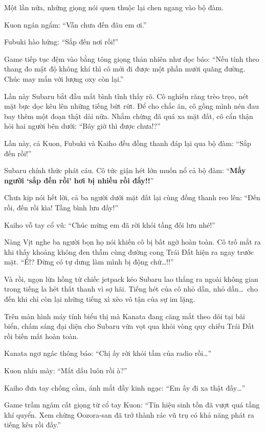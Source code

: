 \documentclass[../main.tex]{subfiles}
\begin{document}
Một lần nữa, những giọng nói quen thuộc lại chen ngang vào bộ đàm.

Kuon ngán ngẩm: ``Vẫn chưa đến đâu em ơi.''

Fubuki hào hứng: ``Sắp đến nơi rồi!''

Game tiếp tục đệm vào bằng tông giọng thản nhiên như đọc báo: ``Nếu tính theo thang đo mật độ không khí thì cô mới đi được một phần mười quãng đường. Chúc may mắn với lượng oxy còn lại.''

Lần này Subaru bắt đầu mất bình tĩnh thấy rõ. Cô nghiến răng trèo trẹo, nét mặt bực dọc kêu lên những tiếng bứt rứt. Để cho chắc ăn, cô gồng mình nén đau bay thêm một đoạn thật dài nữa. Nhắm chừng đã quá xa mặt đất, cô cẩn thận hỏi hai người bên dưới: ``Bây giờ thì được chưa!?''

Lần này, cả Kuon, Fubuki và Kaiho đều đồng thanh đáp lại qua bộ đàm: ``Sắp đến rồi!''

Subaru chính thức phát cáu. Cô tức giận hét lớn muốn nổ cả bộ đàm: ``\textbf{Mấy người `sắp đến rồi' hơi bị nhiều rồi đấy!!}''

Chưa kịp nói hết lời, cả ba người dưới mặt đất lại cùng đồng thanh reo lên: ``Đến rồi, đến rồi kìa! Tầng bình lưu đấy!''

Kaiho vỗ tay cổ vũ: ``Chúc mừng em đã rời khỏi tầng đối lưu nhé!''

Nàng Vịt nghe ba người bọn họ nói khiến cô bị bất ngờ hoàn toàn. Cô trố mắt ra khi thấy khoảng không đen thẫm cùng đường cong Trái Đất hiện ra ngay trước mặt. ``Ể!? Đừng có tự dưng làm mình bị động chứ\dots!!''

Và rồi, ngọn lửa hồng từ chiếc jetpack kéo Subaru lao thẳng ra ngoài không gian trong tiếng la hét thất thanh vì sợ hãi. Tiếng hét của cô nhỏ dần, nhỏ dần\dots\ cho đến khi chỉ còn lại những tiếng xì xèo vô tận của sự im lặng.

Trên màn hình máy tính biểu thị mà Kanata đang căng mắt theo dõi tại bãi biển, chấm sáng đại diện cho Subaru vừa vọt qua khỏi vòng quy chiếu Trái Đất rồi biến mất hoàn toàn.


Kanata ngơ ngác thông báo: ``Chị ấy rời khỏi tầm của radio rồi\dots''

Kuon nhíu mày: ``Mất dấu luôn rồi à?''

Kaiho đưa tay chống cằm, ánh mắt đầy kinh ngạc: ``Em ấy đi xa thật đấy\dots''

Game trầm ngâm cất giọng từ cổ tay Kuon: ``Tín hiệu sinh tồn đã vượt quá tầng khí quyển. Xem chừng Oozora-san đã trở thành rác vũ trụ có khả năng phát ra tiếng kêu rồi đấy.''
\end{document}
